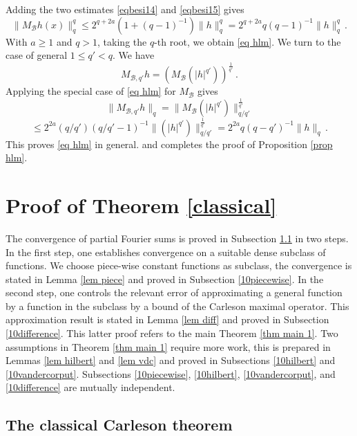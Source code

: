 Adding the two estimates
\eqref{eqbesi14} and \eqref{eqbesi15} gives
\begin{equation}
    \|M_{\mathcal{B}}h(x)\|_q^q
    \le 2^{q+2a} (1+(q-1)^{-1})\|h\|_q^q
    = 2^{q+2a} q(q-1)^{-1}\|h\|_q^q
    \, .
    \end{equation}
With $a\ge 1$ and $q>1$, taking the $q$-th root, we obtain \eqref{eq hlm}.
We turn to the case of general
$1\le q'<q$.
We have
\begin{equation}
    M_{\mathcal{B},q'}h=(M_{\mathcal{B}} (|h|^{q'}))^{\frac 1{q'}}\, .
\end{equation}
Applying the special case of \eqref{eq hlm} for $M_{\mathcal{B}}$ gives
\begin{equation}
    \|M_{\mathcal{B},q'}h\|_q=
    \|M_{\mathcal{B}} (|h|^{q'})\|_{q/q'}^{\frac 1{q'}}
\end{equation}
\begin{equation}
    \le 2^{2a} (q/q') (q/q'-1)^{-1}
    \|(|h|^{q'})\|_{q/q'}^{\frac 1{q'}}
    =2^{2a} q(q-q')^{-1}\|h\|_q\, .
\end{equation}
This proves \eqref{eq hlm} in general.
and completes the proof of Proposition \ref{prop hlm}.

\chapter{Proof of Theorem \ref{classical}}

The convergence of partial Fourier sums is proved in
Subsection \ref{10classical} in two steps. In the first step,
one establishes convergence on a suitable dense subclass of functions. We choose piece-wise constant functions as subclass, the convergence is stated in Lemma \ref{lem piece} and proved in Subsection \ref{10piecewise}.
In the second step, one controls the relevant error of approximating a general function by a function in
the subclass by a bound of the Carleson maximal operator. This approximation result is stated
in Lemma \ref{lem diff} and proved in Subsection \ref{10difference}.
This latter proof refers to the main Theorem \ref{thm main 1}. Two assumptions in Theorem \ref{thm main 1} require more work, this is prepared in Lemmas \ref{lem hilbert} and \ref{lem vdc} and proved in Subsections \ref{10hilbert}
and \ref{10vandercorput}. Subsections \ref{10piecewise},
\ref{10hilbert}, \ref{10vandercorput}, and \ref{10difference}
are mutually independent.


\section{The classical Carleson theorem}
\label{10classical}

